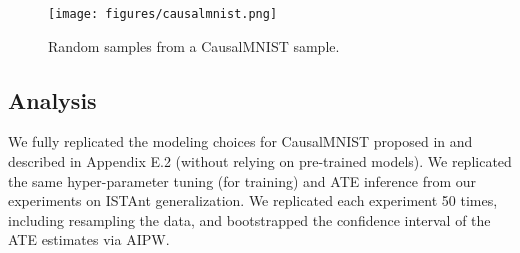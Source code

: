 \begin{figure}[h] 
    \centering
    \texttt{[image: figures/causalmnist.png]} 
    \caption{Random samples from a CausalMNIST sample.}
    \label{fig:causalmnist}
\end{figure}

\subsection{Analysis}
We fully replicated the modeling choices for CausalMNIST proposed in \citet{cadei2024smoke} and described in Appendix E.2 (without relying on pre-trained models). We replicated the same hyper-parameter tuning (for training) and ATE inference from our experiments on ISTAnt generalization. We replicated each experiment 50 times, including resampling the data, and bootstrapped the confidence interval of the ATE estimates via AIPW.